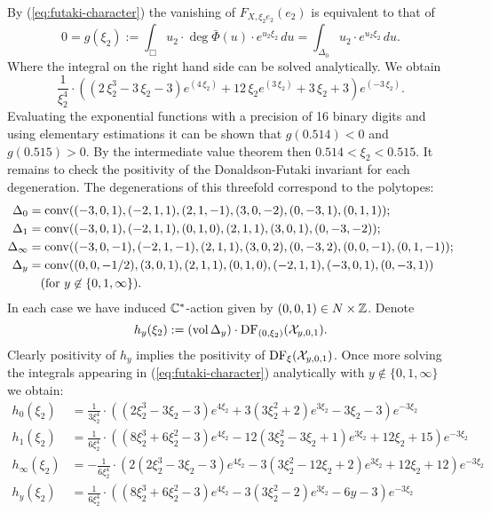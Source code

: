 \begin{example}
By (\ref{eq:futaki-character}) the vanishing of $F_{X,\xi_2e_2}(e_2)$ is equivalent to that of
\[0=g(\xi_2) := \int_{\Box} u_2 \cdot \deg \bar \Phi(u) \cdot e^{u_2 \xi_2}\, du = \int_{\Delta_0} u_2 \cdot e^{u_2 \xi_2}\, du.\] Where the integral on the right hand side can be solved analytically. We obtain
\[
\frac{1}{\xi_{2}^{4}}\cdot\left({\left(2 \, \xi_{2}^{3} - 3 \, \xi_{2} - 3\right)} e^{\left(4 \, \xi_{2}\right)} + 12 \, \xi_{2} e^{\left(3 \, \xi_{2}\right)} + 3 \, \xi_{2} + 3\right) e^{\left(-3 \, \xi_{2}\right)}.
\]
Evaluating the exponential functions with a precision of 16 binary digits  and using elementary estimations it can be shown that \(g(0.514) <0\) and \(g(0.515)>0\). By the intermediate value theorem then \(0.514 < \xi_2 < 0.515\). It remains to check the positivity of the Donaldson-Futaki invariant for each degeneration. The degenerations of this threefold correspond to the polytopes:{
\begin{align*}
\Delta_0 &= \operatorname{conv}((-3,0,1),(-2,1,1),(2,1,-1),(3,0,-2),(0,-3,1),(0,1,1)); \\
\Delta_1 &= \operatorname{conv}((-3,0,1),(-2,1,1),(0,1,0),(2,1,1),(3,0,1),(0,-3,-2)); \\ 
\Delta_\infty &= \operatorname{conv}((-3,0,-1),(-2,1,-1),(2,1,1),(3,0,2),(0,-3,2),(0,0,-1),(0,1,-1)); \\
\Delta_y &= \operatorname{conv}((0, 0, -1/2), (3, 0, 1), (2, 1, 1), (0, 1, 0), (-2, 1, 1), (-3, 0, 1), (0, -3, 1)) \\ 
& \ \ \ ( \text{for } y 
\not \in \{0,1,\infty\} ).
\end{align*}}
In each case we have induced \(\mathbb{C}^*\)-action given by \((0,0,1) \in N \times \mathbb{Z} \). Denote
\[
h_y(\xi_2) := (\mathop{\rm vol}\nolimits \Delta_y) \cdot \mathop{\rm DF}\nolimits_{(0,\xi_2)}({\mathcal{X}}_{y,0,1}).
\]
Clearly positivity of \(h_y\) implies the positivity of \(\mathop{\rm DF}\nolimits_\xi({\mathcal{X}}_{y,0,1})\). 
Once more solving the integrals appearing in (\ref{eq:futaki-character}) analytically with $y \not \in \{0,1,\infty\}$  we obtain:
\begin{align*}
h_0(\xi_2) &= \frac{1}{3\xi_2^{4}}\cdot
{\left({\left(2   \xi_2^{3} - 3   \xi_2 - 3\right)} e^{4   \xi_2} + 3   {\left(3   \xi_2^{2} + 2\right)} e^{3   \xi_2} - 3   \xi_2 - 3\right)} e^{-3   \xi_2}
\\
h_1(\xi_2) &= \frac{1}{6   \xi_2^{4}}\cdot
{\left({\left(8   \xi_2^{3} + 6   \xi_2^{2} - 3\right)} e^{4   \xi_2} - 12   {\left(3   \xi_2^{2} - 3   \xi_2 + 1\right)} e^{3   \xi_2} + 12   \xi_2 + 15\right)} e^{-3   \xi_2} \\
h_\infty(\xi_2) &= -\frac{1}{6   \xi_2^{4}}\cdot
{\left(2   {\left(2   \xi_2^{3} - 3   \xi_2 - 3\right)} e^{4   \xi_2} - 3   {\left(3   \xi_2^{2} - 12   \xi_2 + 2\right)} e^{3   \xi_2} + 12   \xi_2 + 12\right)} e^{-3   \xi_2} \\
h_y(\xi_2) &= \frac{1}{6   \xi_2^{4}}\cdot{\left({\left(8   \xi_2^{3} + 6   \xi_2^{2} - 3\right)} e^{4   \xi_2 } - 3   {\left(3   \xi_2^{2} - 2\right)} e^{3   \xi_2} - 6   y - 3\right)} e^{-3   \xi_2} 
\end{align*}


\end{example}
